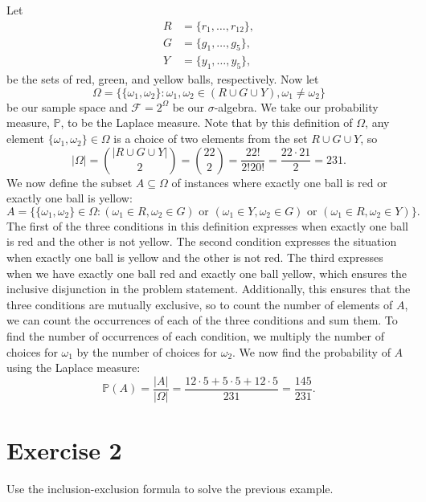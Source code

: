 \documentclass[12pt]{article}
\newenvironment{problem}
    {\begin{lrbox}{\mybox}\begin{minipage}{\textwidth-10pt}}
    {\end{minipage}\end{lrbox}\framebox[6.5in]{\usebox{\mybox}}}
\newcommand{\FF}{\mathcal{F}}
\renewcommand{\P}{\mathbb{P}}
\begin{document}
Let 
\begin{align*}
    R &= \{r_1,\dots, r_{12}\}, \\
    G &= \{g_1,\dots,g_5\}, \\
    Y &= \{y_1, \dots, y_5\},
\end{align*}
be the sets of red, green, and yellow balls, respectively. Now let
\[\Omega = \{\{\omega_1, \omega_2\} : \omega_1,\omega_2 \in (R\cup G \cup Y), \omega_1\ne\omega_2\}\]
be our sample space and $\FF = 2^\Omega$ be our $\sigma$-algebra. We take our probability measure, $\P$, to be the Laplace measure. Note that by this definition of $\Omega$, any element $\{\omega_1,\omega_2\}\in\Omega$ is a choice of two elements from the set $R\cup G\cup Y$, so
\[|\Omega| =  {|R\cup G \cup Y| \choose 2} = {22 \choose 2} = \frac{22!}{2!20!} = \frac{22\cdot 21}{2} = 231.\]
We now define the subset $A\subseteq\Omega$ of instances where exactly one ball is red or exactly one ball is yellow:
\[A = \{\{\omega_1,\omega_2\} \in \Omega : (\omega_1\in R, \omega_2\in G) \text{ or }  (\omega_1\in Y, \omega_2\in G) \text{ or } (\omega_1\in R, \omega_2\in Y)\}.\]
The first of the three conditions in this definition expresses when exactly one ball is red and the other is not yellow. The second condition expresses the situation when exactly one ball is yellow and the other is not red. The third expresses when we have exactly one ball red and exactly one ball yellow, which ensures the inclusive disjunction in the problem statement. Additionally, this ensures that the three conditions are mutually exclusive, so to count the number of elements of $A$, we can count the occurrences of each of the three conditions and sum them. To find the number of occurrences of each condition, we multiply the number of choices for $\omega_1$ by the number of choices for $\omega_2$. We now find the probability of $A$ using the Laplace measure:
\[\P(A) = \frac{|A|}{|\Omega|} = \frac{12\cdot5 + 5\cdot5 + 12\cdot 5}{231} = \frac{145}{231}.\]


\section*{Exercise 2}
\begin{problem}
    Use the inclusion-exclusion formula to solve the previous example.
\end{problem}
\paragraph{}
\end{document}
